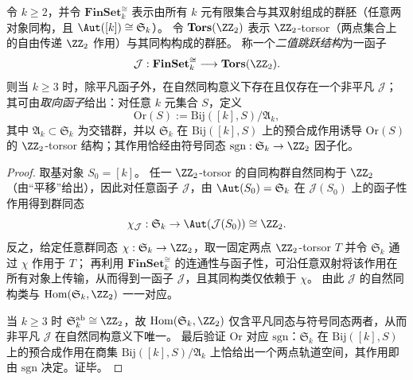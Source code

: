 \begin{theorem}\label{thm:bdry-binary-jump-orientation-functor-uniqueness}
令 \(k\ge 2\)，并令 \(\mathbf{FinSet}_k^{\cong}\) 表示由所有 \(k\) 元有限集合与其双射组成的群胚（任意两对象同构，且 \(\Aut([k])\cong \mathfrak S_k\)）。
令 \(\mathbf{Tors}(\ZZ_2)\) 表示 \(\ZZ_2\)-torsor（两点集合上的自由传递 \(\ZZ_2\) 作用）与其同构构成的群胚。
称一个\emph{二值跳跃结构}为一函子
\[
\mathcal{J}:\mathbf{FinSet}_k^{\cong}\longrightarrow \mathbf{Tors}(\ZZ_2).
\]
则当 \(k\ge 3\) 时，除平凡函子外，在自然同构意义下存在且仅存在一个非平凡 \(\mathcal{J}\)；
其可由\emph{取向函子}给出：对任意 \(k\) 元集合 \(S\)，定义
\[
\mathrm{Or}(S):=\mathrm{Bij}([k],S)\big/\mathfrak A_k,
\]
其中 \(\mathfrak A_k\subset \mathfrak S_k\) 为交错群，并以 \(\mathfrak S_k\) 在 \(\mathrm{Bij}([k],S)\) 上的预合成作用诱导 \(\mathrm{Or}(S)\) 的 \(\ZZ_2\)-torsor 结构；其作用恰经由符号同态 \(\mathrm{sgn}:\mathfrak S_k\to\ZZ_2\) 因子化。
\end{theorem}

\begin{proof}
取基对象 \(S_0=[k]\)。
任一 \(\ZZ_2\)-torsor 的自同构群自然同构于 \(\ZZ_2\)（由“平移”给出），因此对任意函子 \(\mathcal{J}\)，由 \(\Aut(S_0)=\mathfrak S_k\) 在 \(\mathcal{J}(S_0)\) 上的函子性作用得到群同态
\[
\chi_{\mathcal{J}}:\mathfrak S_k\to \Aut(\mathcal{J}(S_0))\cong \ZZ_2.
\]
反之，给定任意群同态 \(\chi:\mathfrak S_k\to\ZZ_2\)，取一固定两点 \(\ZZ_2\)-torsor \(T\) 并令 \(\mathfrak S_k\) 通过 \(\chi\) 作用于 \(T\)；
再利用 \(\mathbf{FinSet}_k^{\cong}\) 的连通性与函子性，可沿任意双射将该作用在所有对象上传输，从而得到一函子 \(\mathcal{J}\)，且其同构类仅依赖于 \(\chi\)。
由此 \(\mathcal{J}\) 的自然同构类与 \(\mathrm{Hom}(\mathfrak S_k,\ZZ_2)\) 一一对应。
\par
当 \(k\ge 3\) 时 \(\mathfrak S_k^{\mathrm{ab}}\cong \ZZ_2\)，故 \(\mathrm{Hom}(\mathfrak S_k,\ZZ_2)\) 仅含平凡同态与符号同态两者，从而非平凡 \(\mathcal{J}\) 在自然同构意义下唯一。
最后验证 \(\mathrm{Or}\) 对应 \(\mathrm{sgn}\)：\(\mathfrak S_k\) 在 \(\mathrm{Bij}([k],S)\) 上的预合成作用在商集 \(\mathrm{Bij}([k],S)/\mathfrak A_k\) 上恰给出一个两点轨道空间，其作用即由 \(\mathrm{sgn}\) 决定。证毕。
\end{proof}

